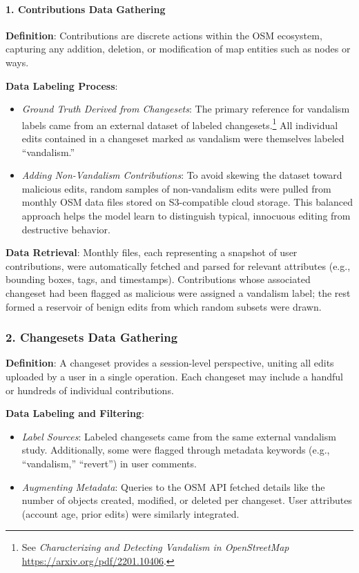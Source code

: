 \documentclass[
    13pt, %
    a4paper, %
    twoside, 
    DIV14, %
    listof=totoc, %
    bibliography=totoc, %
    index=totoc, %
    headsepline
]{scrreprt}
\begin{document}
\vspace{0.5em}
\paragraph{1. Contributions Data Gathering}
\vspace{0.25em}

\noindent
\textbf{Definition}: Contributions are discrete actions within the OSM ecosystem, capturing any addition, deletion, or modification of map entities such as nodes or ways.

\noindent
\textbf{Data Labeling Process}:
\begin{itemize}
    \item \textit{Ground Truth Derived from Changesets}: The primary reference for vandalism labels came from an external dataset of labeled changesets.\footnote{See \textit{Characterizing and Detecting Vandalism in OpenStreetMap} \url{https://arxiv.org/pdf/2201.10406}.} All individual edits contained in a changeset marked as vandalism were themselves labeled “vandalism.”
    \item \textit{Adding Non-Vandalism Contributions}: To avoid skewing the dataset toward malicious edits, random samples of non-vandalism edits were pulled from monthly OSM data files stored on S3-compatible cloud storage. This balanced approach helps the model learn to distinguish typical, innocuous editing from destructive behavior.
\end{itemize}

\noindent
\textbf{Data Retrieval}:  
Monthly files, each representing a snapshot of user contributions, were automatically fetched and parsed for relevant attributes (e.g., bounding boxes, tags, and timestamps). Contributions whose associated changeset had been flagged as malicious were assigned a vandalism label; the rest formed a reservoir of benign edits from which random subsets were drawn.

\subsubsection{2. Changesets Data Gathering}
\noindent
\textbf{Definition}: A changeset provides a session-level perspective, uniting all edits uploaded by a user in a single operation. Each changeset may include a handful or hundreds of individual contributions.

\noindent
\textbf{Data Labeling and Filtering}:
\begin{itemize}
    \item \textit{Label Sources}: Labeled changesets came from the same external vandalism study. Additionally, some were flagged through metadata keywords (e.g., “vandalism,” “revert”) in user comments.  
    \item \textit{Augmenting Metadata}: Queries to the OSM API fetched details like the number of objects created, modified, or deleted per changeset. User attributes (account age, prior edits) were similarly integrated.
\end{itemize}
\end{document}
